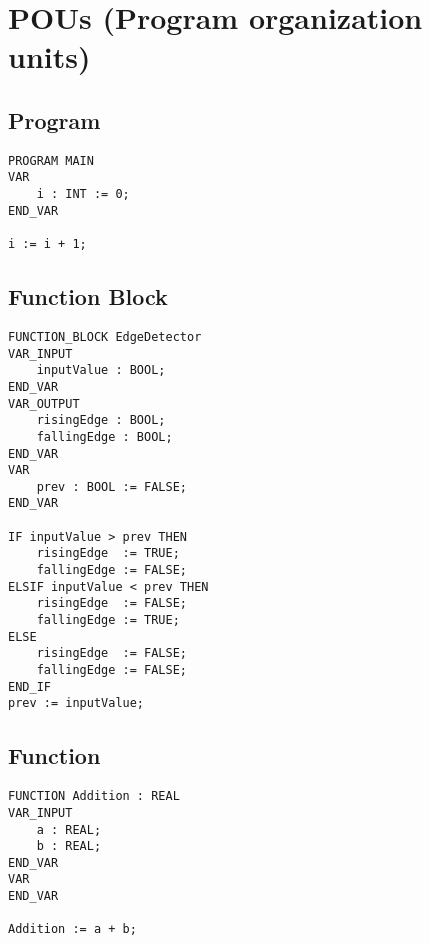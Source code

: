 


\section{POUs (Program organization units)}

\subsection{Program}
\begin{lstlisting}
PROGRAM MAIN
VAR
    i : INT := 0;
END_VAR

i := i + 1;
\end{lstlisting}

\subsection{Function Block}
\begin{lstlisting}
FUNCTION_BLOCK EdgeDetector
VAR_INPUT
    inputValue : BOOL;
END_VAR
VAR_OUTPUT
    risingEdge : BOOL;
    fallingEdge : BOOL;
END_VAR
VAR
    prev : BOOL := FALSE;
END_VAR

IF inputValue > prev THEN
    risingEdge  := TRUE;
    fallingEdge := FALSE;
ELSIF inputValue < prev THEN
    risingEdge  := FALSE;
    fallingEdge := TRUE;
ELSE
    risingEdge  := FALSE;
    fallingEdge := FALSE;
END_IF
prev := inputValue;
\end{lstlisting}

\subsection{Function}
\begin{lstlisting}
FUNCTION Addition : REAL
VAR_INPUT
    a : REAL;
    b : REAL;
END_VAR
VAR
END_VAR

Addition := a + b;
\end{lstlisting}

